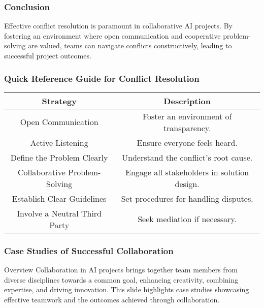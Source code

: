 \documentclass[aspectratio=169]{beamer}
\begin{document}
\begin{frame}[fragile]
    \frametitle{Conclusion}
    Effective conflict resolution is paramount in collaborative AI projects. By fostering an environment where open communication and cooperative problem-solving are valued, teams can navigate conflicts constructively, leading to successful project outcomes.
\end{frame}

\begin{frame}[fragile]
    \frametitle{Quick Reference Guide for Conflict Resolution}
    \begin{center}
        \begin{tabular}{|c|c|}
            \hline
            \textbf{Strategy} & \textbf{Description} \\
            \hline
            Open Communication & Foster an environment of transparency. \\
            Active Listening & Ensure everyone feels heard. \\
            Define the Problem Clearly & Understand the conflict's root cause. \\
            Collaborative Problem-Solving & Engage all stakeholders in solution design. \\
            Establish Clear Guidelines & Set procedures for handling disputes. \\
            Involve a Neutral Third Party & Seek mediation if necessary. \\
            \hline
        \end{tabular}
    \end{center}
\end{frame}

\begin{frame}[fragile]
    \frametitle{Case Studies of Successful Collaboration}
    \begin{block}{Overview}
        Collaboration in AI projects brings together team members from diverse disciplines towards a common goal, enhancing creativity, combining expertise, and driving innovation. This slide highlights case studies showcasing effective teamwork and the outcomes achieved through collaboration.
    \end{block}
\end{frame}
\end{document}
